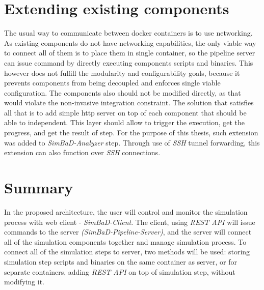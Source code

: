 \section{Extending existing components}
The usual way to communicate between docker containers is to use networking. As existing components do not have networking capabilities, the only viable way to connect all of them is to place them in single container, so the pipeline server can issue command by directly executing components scripts and binaries. This however does not fulfill the modularity and configurability goals, because it prevents components from being decoupled and enforces single viable configuration. The components also should not be modified directly, as that would violate the non-invasive integration constraint. The solution that satisfies all that is to add simple http server on top of each component that should be able to independent. This layer should allow to trigger the execution, get the progress, and get the result of step. For the purpose of this thesis, such extension was added to \textit{SimBaD-Analyzer} step. Through use of \textit{SSH} tunnel forwarding, this extension can also function over \textit{SSH} connections.
\section{Summary}
In the proposed architecture, the user will control and monitor the simulation process with web client - \textit{SimBaD-Client}. The client, using \textit{REST API} will issue commands to the server \textit{(SimBaD-Pipeline-Server)}, and the server will connect all of the simulation components together and manage simulation process. To connect all of the simulation steps to server, two methods will be used: storing simulation step scripts and binaries on the same container as server, or for separate containers, adding \textit{REST API} on top of simulation step, without modifying it.